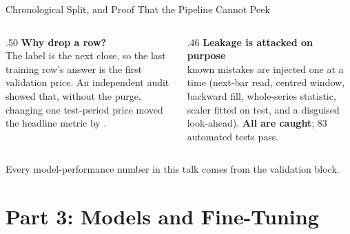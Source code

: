 \documentclass[aspectratio=169,11pt]{beamer}
\newcommand{\currentspeaker}{}
\newcommand{\speaker}[1]{\gdef\currentspeaker{#1}}
\newcounter{progresssection}
\newcommand{\progresssection}[1]{\setcounter{progresssection}{#1}}
\newcommand{\act}[1]{\section{#1}}
\begin{document}
\begin{frame}{Chronological Split, and Proof That the Pipeline Cannot Peek}
  \speaker{Zhang Yancheng}
  \centering
  \par\vspace{2mm}
  \begin{columns}[T,onlytextwidth]
    \begin{column}{.50\textwidth}
      \small\textbf{Why drop a row?}\\
      \footnotesize The label is the next close, so the last training row's answer is the first
      validation price. An independent audit showed that, without the purge, changing one
      test-period price moved the headline metric by \textbf{\LeakDelta{}}.
    \end{column}
    \begin{column}{.46\textwidth}
      \small\textbf{Leakage is attacked on purpose}\\
      \footnotesize \NMutations{} known mistakes are injected one at a time (next-bar read,
      centred window, backward fill, whole-series statistic, scaler fitted on test, and a disguised
      look-ahead). \textbf{All \NMutations{} are caught}; 83 automated tests pass.
    \end{column}
  \end{columns}
  \par\vspace{2mm}
  \raggedright\footnotesize Every model-performance number in this talk comes from the validation block.
\end{frame}

\act{Part 3: Models and Fine-Tuning}
\progresssection{3}
\end{document}
